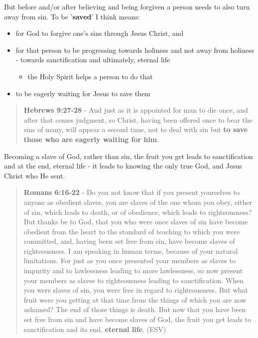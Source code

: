\documentclass[11pt]{article}
\begin{document}
But before and/or after believing and being forgiven a person needs to also turn away from sin.
To be '\textbf{saved}' I think means:
\begin{itemize}
\item for God to forgive one's sins through Jesus Christ, and
\item for that person to be progressing towards holiness and not away from holiness - towards sanctification and ultimately, eternal life
\begin{itemize}
\item the Holy Spirit helps a person to do that
\end{itemize}
\item to be eagerly waiting for Jesus to save them
\end{itemize}

\begin{quote}
\textbf{Hebrews 9:27-28} - And just as it is appointed for man to die once, and after that comes judgment, so Christ, having been offered once to bear the sins of many, will appear a second time, not to deal with sin but \textbf{to save those who are eagerly waiting for him}.
\end{quote}

Becoming a slave of God, rather than sin, the fruit you get leads to sanctification and at the end, eternal life - it leads to knowing the only true God, and Jesus Christ who He sent.

\begin{quote}
\textbf{Romans 6:16-22} - Do you not know that if you present yourselves to anyone as obedient slaves, you are slaves of the one whom you obey, either of sin, which leads to death, or of obedience, which leads to righteousness? But thanks be to God, that you who were once slaves of sin have become obedient from the heart to the standard of teaching to which you were committed, and, having been set free from sin, have become slaves of righteousness. I am speaking in human terms, because of your natural limitations. For just as you once presented your members as slaves to impurity and to lawlessness leading to more lawlessness, so now present your members as slaves to righteousness leading to sanctification. When you were slaves of sin, you were free in regard to righteousness. But what fruit were you getting at that time from the things of which you are now ashamed? The end of those things is death. But now that you have been set free from sin and have become slaves of God, the fruit you get leads to sanctification and its end, \textbf{eternal life}. (ESV)
\end{quote}
\end{document}
